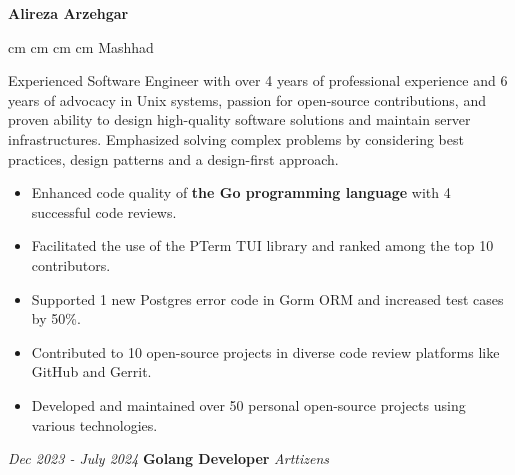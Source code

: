 \documentclass{engineercv}
\begin{document}
\begin{center}
  \textbf{\fontsize{24 pt}{24 pt}\selectfont Alireza Arzehgar}

  \vspace{0.2 cm}

  \scriptsize
  \mbox{}
   cm
  \mbox{}
   cm
  \mbox{}
   cm
  \mbox{}
   cm
  \mbox{{\color{black}\footnotesize\faMapMarker*}\hspace*{0.13cm}Mashhad}
\end{center}


Experienced Software Engineer with over 4 years of professional experience and 6 years of advocacy in Unix systems,
passion for open-source contributions, and proven ability to design high-quality software solutions and
maintain server infrastructures. Emphasized solving complex problems by considering best practices,
design patterns and a design-first approach.

\begin{itemize}
  \item Enhanced code quality of \textbf{the Go programming language} with 4 successful code reviews.
  \item Facilitated the use of the PTerm TUI library and ranked among the top 10 contributors.
  \item Supported 1 new Postgres error code in Gorm ORM and increased test cases by 50\%.
  \item Contributed to 10 open-source projects in diverse code review platforms like GitHub and Gerrit.
  \item Developed and maintained over 50 personal open-source projects using various technologies.
\end{itemize}

\begin{twocolentry}{\textit{Dec 2023 - July 2024}}
  \textbf{Golang Developer}
  \textit{Arttizens}
\end{twocolentry}
\end{document}
